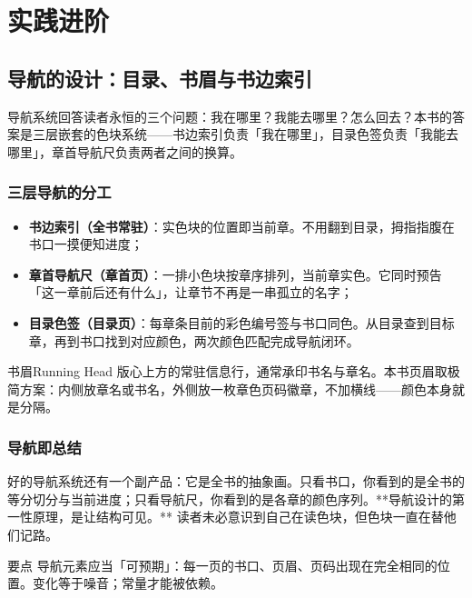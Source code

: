 \documentclass{bookedge}
\begin{document}
\part{实践进阶}

\chapter{导航的设计：目录、书眉与书边索引}

导航系统回答读者永恒的三个问题：我在哪里？我能去哪里？怎么回去？本书的答案是三层嵌套的色块系统——书边索引负责「我在哪里」，目录色签负责「我能去哪里」，章首导航尺负责两者之间的换算。

\section{三层导航的分工}

\begin{itemize}
  \item \textbf{书边索引（全书常驻）}：实色块的位置即当前章。不用翻到目录，拇指指腹在书口一摸便知进度；
  \item \textbf{章首导航尺（章首页）}：一排小色块按章序排列，当前章实色。它同时预告「这一章前后还有什么」，让章节不再是一串孤立的名字；
  \item \textbf{目录色签（目录页）}：每章条目前的彩色编号签与书口同色。从目录查到目标章，再到书口找到对应颜色，两次颜色匹配完成导航闭环。
\end{itemize}

\begin{entry}{书眉}{Running Head}
版心上方的常驻信息行，通常承印书名与章名。本书页眉取极简方案：内侧放章名或书名，外侧放一枚章色页码徽章，不加横线——颜色本身就是分隔。
\end{entry}

\section{导航即总结}

好的导航系统还有一个副产品：它是全书的抽象画。只看书口，你看到的是全书的等分切分与当前进度；只看导航尺，你看到的是各章的颜色序列。**导航设计的第一性原理，是让结构可见。** 读者未必意识到自己在读色块，但色块一直在替他们记路。

\begin{notebox}{要点}
导航元素应当「可预期」：每一页的书口、页眉、页码出现在完全相同的位置。变化等于噪音；常量才能被依赖。
\end{notebox}
\end{document}
